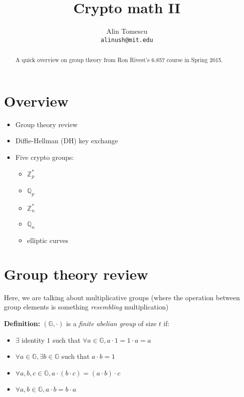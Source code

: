 \documentclass[11pt]{article}
\newcommand{\Zp}{\mathbb{Z}^{\ast}_p}
\newcommand{\Zn}{\mathbb{Z}^{\ast}_n}
\newcommand{\Qp}{\mathbb{Q}_p}
\newcommand{\Qn}{\mathbb{Q}_n}
\newcommand{\G}{\mathbb{G}}
\newcommand{\definition}{\textbf{Definition:} }
\begin{document}
\title{Crypto math II}
\author{Alin Tomescu\\
  \texttt{alinush@mit.edu}}

\maketitle

\begin{abstract}
A quick overview on group theory from Ron Rivest's 6.857 course in Spring 2015.
\end{abstract}

\section{Overview}

\begin{itemize}
  \item Group theory review
  \item Diffie-Hellman (DH) key exchange
  \item Five crypto groups:
  \begin{itemize}
    \item $\Zp$
    \item $\Qp$
    \item $\Zn$
    \item $\Qn$
    \item elliptic curves
  \end{itemize}
\end{itemize}

\section{Group theory review}

Here, we are talking about multiplicative groups (where the operation between
group elements is something \emph{resembling} multiplication)

\definition $(\G, \cdot)$ is a \emph{finite abelian group} of size $t$ if:

\begin{itemize}
  \item $\exists$ identity $1$ such that $\forall a \in \G, a\cdot 1 = 1\cdot a = a$
  \item $\forall a     \in \G, \exists b \in \G$ such that $a\cdot b = 1$
  \item $\forall a,b,c \in \G, a\cdot (b\cdot c) = (a\cdot b)\cdot c$
  \item $\forall a,b   \in \G, a\cdot b = b\cdot a$
\end{itemize}
\end{document}

